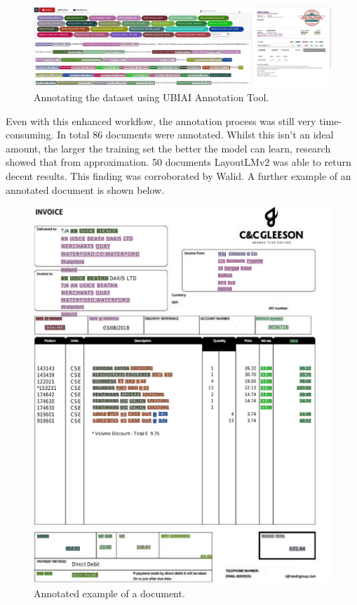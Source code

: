 \begin{enumerate}
	      \begin{figure}[H]
		      \centering
		      \includegraphics[width=1\textwidth]{figures/ubiai_annotate.png}
		      \caption{Annotating the dataset using UBIAI Annotation Tool.}
		      \label{fig:training_annotations}
	      \end{figure}
	      Even with this enhanced workflow, the annotation process was still very time-consuming. In total 86 documents
	      were annotated. Whilst this isn't an ideal amount, the larger the training set the better the model can
	      learn, research showed that from approximation. 50 documents LayoutLMv2 was able to return decent results.
	      This finding was corroborated by Walid.
	      \newpage
	      A further example of an annotated document is shown below.
	      \begin{figure}[H]
		      \centering
		      \includegraphics[width=1\textwidth]{figures/annotation_example.png}
		      \caption{Annotated example of a document.}
		      \label{fig:ubiai_annotate_example}
	      \end{figure}
	      \newpage


\end{enumerate}
